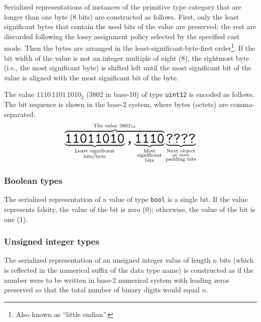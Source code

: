 Serialized representations of instances of the primitive type category that are longer than one byte (8 bits)
are constructed as follows.
First, only the least significant bytes that contain the used bits of the value are preserved;
the rest are discarded following the lossy assignment policy selected by the specified cast mode.
Then the bytes are arranged in the least-significant-byte-first order\footnote{Also known as ``little endian''.}.
If the bit width of the value is not an integer multiple of eight (8),
the rightmost byte (i.e., the most significant byte) is shifted left until the most significant bit of the value
is aligned with the most significant bit of the byte.

\begin{remark}
    The value $1110\,1101\,1010_2$ (3802 in base-10) of type \verb|uint12| is encoded as follows.
    The bit sequence is shown in the base-2 system, where bytes (octets) are comma-separated:
    $$
        \overbrace{%
            \underbrace{\hugett{11011010}}_{\substack{\text{Least significant} \\ \text{bits/byte}}}%
            \hugett{,}%
            \underbrace{\hugett{1110}}_{\substack{\text{Most} \\ \text{significant} \\ \text{bits}}}%
        }^{\text{The value }3802_{10}}%
        \underbrace{\hugett{????}}_{\substack{\text{Next object} \\ \text{or zero} \\ \text{padding bits}}}
    $$
\end{remark}

\subsubsection{Boolean types}\label{sec:dsdl_serialized_bool}

The serialized representation of a value of type \verb|bool| is a single bit.
If the value represents falsity, the value of the bit is zero (0); otherwise, the value of the bit is one (1).

\subsubsection{Unsigned integer types}\label{sec:dsdl_serialized_unsigned_integer}

The serialized representation of an unsigned integer value of length $n$ bits
(which is reflected in the numerical suffix of the data type name)
is constructed as if the number were to be written in base-2 numerical system
with leading zeros preserved so that the total number of binary digits would equal $n$.

